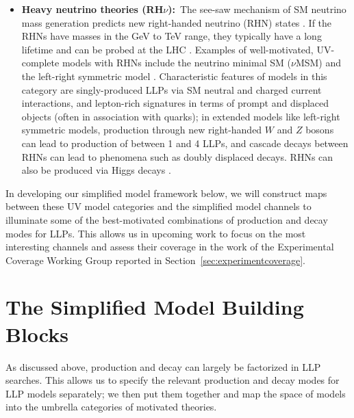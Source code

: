 \begin{itemize}
\item {\bf Heavy neutrino theories (RH$\nu$):}~The see-saw mechanism of SM neutrino mass generation predicts new right-handed neutrino (RHN) states \cite{Minkowski:1977sc,Yanagida:1979as,Mohapatra:1979ia,Glashow:1979nm,Mohapatra:1986bd}. If the RHNs have masses in the GeV to TeV range, they typically have a long lifetime and can be probed at the LHC \cite{Keung:1983uu,Ferrari:2000sp,Basso:2008iv,Atre:2009rg,Perez:2009mu,Nemevsek:2011hz,Helo:2013esa,Izaguirre:2015pga,Maiezza:2015lza,Batell:2016zod,Nemevsek:2016enw,Accomando:2016rpc,Accomando:2016sge,Caputo:2017pit,Accomando:2017qcs,Cottin:2018kmq,Nemevsek:2018bbt,Helo:2018qej}. Examples of well-motivated, UV-complete models with RHNs include the neutrino minimal SM ($\nu$MSM) \cite{Asaka:2005an,Asaka:2005pn} and the left-right symmetric model \cite{Pati:1974yy,Mohapatra:1974gc,Senjanovic:1975rk,Senjanovic:1978ev}.  Characteristic features of models in this category are singly-produced LLPs via SM neutral and charged current interactions, and lepton-rich signatures in terms of prompt and displaced objects (often in association with quarks); in extended models like left-right symmetric models, production through new right-handed $W$ and $Z$ bosons can lead to production of between 1 and 4 LLPs, and cascade decays between RHNs can lead to phenomena such as doubly displaced decays. RHNs can also be produced via Higgs decays \cite{Graesser:2007yj, Graesser:2007pc,Maiezza:2015lza,Accomando:2016rpc,Das:2017rsu,Caputo:2017pit}.

\end{itemize}

%
In developing our simplified model framework below, we will construct maps between these UV model categories and the simplified model channels to illuminate some of the best-motivated combinations of production and decay modes for LLPs. This  allows us in upcoming work to focus on the most interesting channels and assess their coverage in the work of the Experimental Coverage Working Group reported in Section~\ref{sec:experimentcoverage}.



\section{The Simplified Model Building Blocks}\label{sec:building_blocks}


As discussed above, production and decay can largely be factorized in LLP searches. This allows us to specify the relevant production and decay modes for LLP models separately; we then put them together and map the space of models into the umbrella categories of motivated theories.

